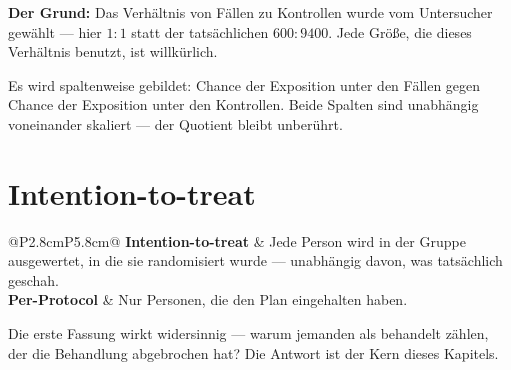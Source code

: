 \begin{merksatz}
\begin{center}
\begin{minipage}{0.9\textwidth}
\textbf{Der Grund:} Das Verhältnis von Fällen zu Kontrollen wurde vom Untersucher gewählt --- hier $1:1$ statt der tatsächlichen $600:9400$. Jede Größe, die dieses Verhältnis benutzt, ist willkürlich.
\end{minipage}
\end{center}

Es wird spaltenweise gebildet: Chance der Exposition unter den Fällen gegen Chance der Exposition unter den Kontrollen. Beide Spalten sind unabhängig voneinander skaliert --- der Quotient bleibt unberührt.

\begin{center}
\begin{minipage}{0.88\textwidth}
\end{minipage}
\end{center}
\end{merksatz}

\section{Intention-to-treat}

\begin{merksatz}
\begin{center}
\renewcommand{\arraystretch}{1.52}
\begin{tabular}{@{}P{2.8cm}P{5.8cm}@{}}
\toprule
\textbf{Intention-to-treat} & Jede Person wird in der Gruppe ausgewertet, in die sie randomisiert wurde --- unabhängig davon, was tatsächlich geschah.\\
\textbf{Per-Protocol} & Nur Personen, die den Plan eingehalten haben.\\
\bottomrule
\end{tabular}
\end{center}

\begin{center}
\begin{minipage}{0.9\textwidth}
Die erste Fassung wirkt widersinnig --- warum jemanden als behandelt zählen, der die Behandlung abgebrochen hat? Die Antwort ist der Kern dieses Kapitels.
\end{minipage}
\end{center}
\end{merksatz}

